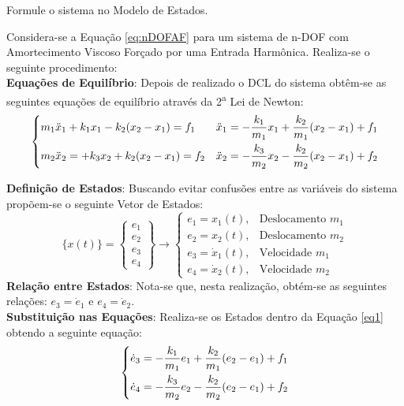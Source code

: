 \documentclass{article}
\begin{document}
\newpage\begin{exercise}\label{ex9}
    Formule o sistema no Modelo de Estados.
\end{exercise}
\begin{resolution}
    Considera-se a Equação \ref{eq:nDOFAF} para um sistema de n-DOF com Amortecimento Viscoso Forçado por uma Entrada Harmônica. Realiza-se o seguinte procedimento:\\

    \textbf{Equações de Equilíbrio}: Depois de realizado o DCL do sistema obtêm-se as seguintes equações de equilíbrio através da 2\textsuperscript{a} Lei de Newton:
    \begin{equation}\label{eq1}
        \begin{dcases}
            m_1 \ddot{x}_1 +k_1 x_1 - k_2 (x_2 - x_1) = f_1 & 
            \ddot{x}_1 = -\frac{k_1}{m_1} x_1 +\frac{k_2}{m_1} (x_2 - x_1) + f_1\\
            m_2 \ddot{x}_2 = +k_3 x_2 + k_2 (x_2 - x_1) = f_2 &
            \ddot{x}_2 = -\frac{k_3}{m_2} x_2 -\frac{k_2}{m_2} (x_2 - x_1) + f_2\\
        \end{dcases}
    \end{equation}

    \textbf{Definição de Estados}: Buscando evitar confusões entre as variáveis do sistema propõem-se o seguinte Vetor de Estados:
    \begin{equation*}
        \lbrace x(t) \rbrace = \begin{Bmatrix} e_1\\ e_2\\ e_3\\ e_4 \end{Bmatrix} 
        \to
        \begin{cases}
            e_1 = x_1(t), &\text{Deslocamento } m_1\\
            e_2 = x_2(t), &\text{Deslocamento } m_2\\
            e_3 = \dot{x}_1(t),&\text{Velocidade } m_1\\
            e_4 = \dot{x}_2(t),&\text{Velocidade } m_2
        \end{cases}
    \end{equation*}
    \textbf{Relação entre Estados}: Nota-se que, nesta realização, obtém-se as seguintes relações: $e_3 = \dot{e}_1$ e $e_4 = \dot{e}_2$.\\

    \textbf{Substituição nas Equações}: Realiza-se os Estados dentro da Equação \ref{eq1} obtendo a seguinte equação:
    \begin{equation*}
        \begin{dcases}
            \dot{e}_3 = -\frac{k_1}{m_1} e_1 +\frac{k_2}{m_1} (e_2 - e_1) + f_1\\
            \dot{e}_4 = -\frac{k_3}{m_2} e_2 -\frac{k_2}{m_2} (e_2 - e_1) + f_2\\
        \end{dcases}
    \end{equation*}
    

\end{resolution}
\end{document}
